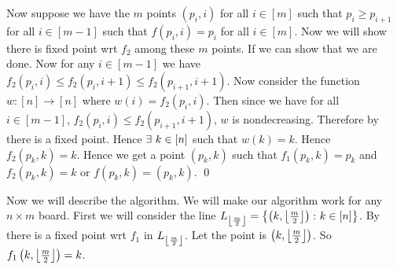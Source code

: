 \documentclass[a4paper, 11pt]{article}
\renewenvironment{proof}{\noindent{\it \textbf{Proof:}}\hspace*{1em}}{\qed\bigskip\\}
\begin{document}
{\begin{proof}
	Now suppose we have the $m$ points $(p_i,i)$ for all $i\in[m]$ such that $p_i\geq p_{i+1}$ for all $i\in[m-1]$ such that $f(p_i,i)=p_i$ for all $i\in[m]$. Now we will show there is fixed point wrt $f_2$ among these $m$ points. If we can show that we are done. Now for any $i\in[m-1]$ we have $f_2(p_i,i)\leq f_2(p_i,i+1)\leq f_2(p_{i+1},i+1)$. Now consider the function $w:[n]\to [n]$ where $w(i)=f_2(p_i,i)$. Then since we have for all $i\in[m-1]$, $f_2(p_i,i)\leq f_2(p_{i+1},i+1)$, $w$ is nondecreasing. Therefore by  there is a fixed point. Hence $\exists \ k\in[n]$ such that $w(k)=k$. Hence $f_2(p_k,k)=k$. Hence we get a point $(p_k,k)$ such that $f_1(p_k,k)=p_k$ and $f_2(p_k,k)=k$ or $f(p_k,k)=(p_k,k)$. 
\end{proof}

Now we will describe the algorithm. We will make our algorithm work for any $n\times m$ board. 
First we will consider the line $L_{\left\lfloor \frac{m}{2}\right\rfloor}=\left\{\left(k,\left\lfloor \frac{m}{2}\right\rfloor\right)\colon k\in[n]\right\}$. By  there is a fixed point wrt $f_1$ in $L_{\left\lfloor \frac{m}{2}\right\rfloor}$. Let the point is $\left(k,\left\lfloor \frac{m}{2}\right\rfloor\right)$. So $f_1\left(k,\left\lfloor \frac{m}{2}\right\rfloor\right)=k$. 

}
\end{document}
